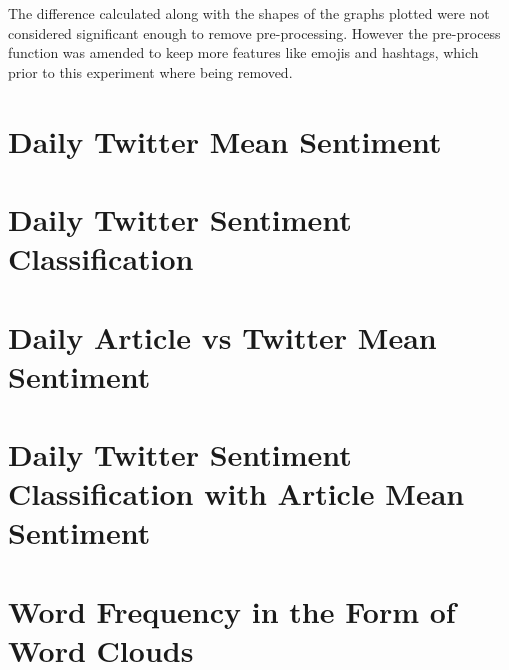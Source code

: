 \noindent The difference calculated along with the shapes of the graphs plotted were not considered significant enough to remove pre-processing.
However the pre-process function was amended to keep more features like emojis and hashtags, which prior to this experiment where being removed.

\section{Daily Twitter Mean Sentiment}



\section{Daily Twitter Sentiment Classification}



\section{Daily Article vs Twitter Mean Sentiment}



\section{Daily Twitter Sentiment Classification with Article Mean Sentiment}



\section{Word Frequency in the Form of Word Clouds}

